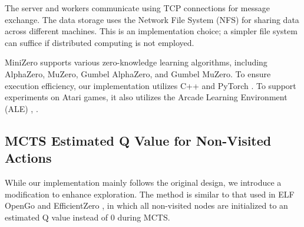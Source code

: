 The server and workers communicate using TCP connections for message exchange.
The data storage uses the Network File System (NFS) for sharing data across different machines.
This is an implementation choice; a simpler file system can suffice if distributed computing is not employed.

MiniZero supports various zero-knowledge learning algorithms, including AlphaZero, MuZero, Gumbel AlphaZero, and Gumbel MuZero. 
To ensure execution efficiency, our implementation utilizes C++ and PyTorch \cite{paszke_pytorch_2019}. To support experiments on Atari games, it also utilizes the Arcade Learning Environment (ALE) \cite{bellemare_arcade_2013}, \cite{machado_revisiting_2018}.

\subsection{MCTS Estimated Q Value for Non-Visited Actions}\label{minizero:estimated_q}
While our implementation mainly follows the original design, we introduce a modification to enhance exploration.
The method is similar to that used in ELF OpenGo \cite{tian_elf_2019} and EfficientZero \cite{ye_mastering_2021}, in which all non-visited nodes are initialized to an estimated Q value instead of $0$ during MCTS.


